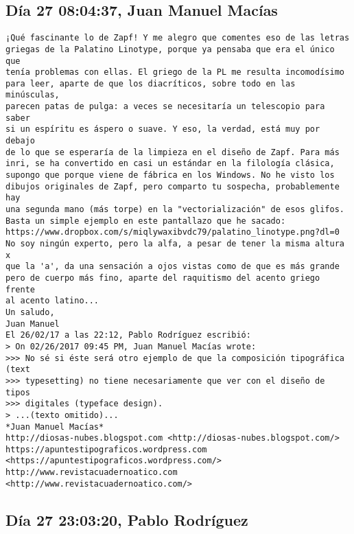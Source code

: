 \documentclass[a4paper,10pt]{article}
\begin{document}
\subsection{Día 27 08:04:37, Juan Manuel Macías}

\begin{lstlisting}
¡Qué fascinante lo de Zapf! Y me alegro que comentes eso de las letras 
griegas de la Palatino Linotype, porque ya pensaba que era el único que 
tenía problemas con ellas. El griego de la PL me resulta incomodísimo 
para leer, aparte de que los diacríticos, sobre todo en las minúsculas, 
parecen patas de pulga: a veces se necesitaría un telescopio para saber 
si un espíritu es áspero o suave. Y eso, la verdad, está muy por debajo 
de lo que se esperaría de la limpieza en el diseño de Zapf. Para más 
inri, se ha convertido en casi un estándar en la filología clásica, 
supongo que porque viene de fábrica en los Windows. No he visto los 
dibujos originales de Zapf, pero comparto tu sospecha, probablemente hay 
una segunda mano (más torpe) en la "vectorialización" de esos glifos. 
Basta un simple ejemplo en este pantallazo que he sacado: 
https://www.dropbox.com/s/miqlywaxibvdc79/palatino_linotype.png?dl=0
No soy ningún experto, pero la alfa, a pesar de tener la misma altura x 
que la 'a', da una sensación a ojos vistas como de que es más grande 
pero de cuerpo más fino, aparte del raquitismo del acento griego frente 
al acento latino...
Un saludo,
Juan Manuel
El 26/02/17 a las 22:12, Pablo Rodríguez escribió:
> On 02/26/2017 09:45 PM, Juan Manuel Macías wrote:
>>> No sé si éste será otro ejemplo de que la composición tipográfica (text
>>> typesetting) no tiene necesariamente que ver con el diseño de tipos
>>> digitales (typeface design).
> ...(texto omitido)...
*Juan Manuel Macías*
http://diosas-nubes.blogspot.com <http://diosas-nubes.blogspot.com/>
https://apuntestipograficos.wordpress.com 
<https://apuntestipograficos.wordpress.com/>
http://www.revistacuadernoatico.com <http://www.revistacuadernoatico.com/>

\end{lstlisting}

\subsection{Día 27 23:03:20, Pablo Rodríguez}
\end{document}
